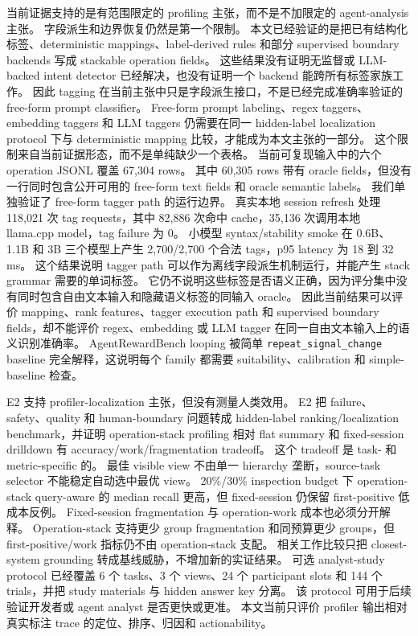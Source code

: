 \documentclass[10pt,twocolumn]{ctexart}
\begin{document}
当前证据支持的是有范围限定的 profiling 主张，而不是不加限定的 agent-analysis 主张。
字段派生和边界恢复仍然是第一个限制。
本文已经验证的是把已有结构化标签、deterministic mappings、label-derived rules 和部分 supervised boundary backends 写成 stackable operation fields。
这些结果没有证明无监督或 LLM-backed intent detector 已经解决，也没有证明一个 backend 能跨所有标签家族工作。
因此 tagging 在当前主张中只是字段派生接口，不是已经完成准确率验证的 free-form prompt classifier。
Free-form prompt labeling、regex taggers、embedding taggers 和 LLM taggers 仍需要在同一 hidden-label localization protocol 下与 deterministic mapping 比较，才能成为本文主张的一部分。
这个限制来自当前证据形态，而不是单纯缺少一个表格。
当前可复现输入中的六个 operation JSONL 覆盖 67,304 rows。
其中 60,305 rows 带有 oracle fields，但没有一行同时包含公开可用的 free-form text fields 和 oracle semantic labels。
我们单独验证了 free-form tagger path 的运行边界。
真实本地 session refresh 处理 118,021 次 tag requests，其中 82,886 次命中 cache，35,136 次调用本地 llama.cpp model，tag failure 为 0。
小模型 syntax/stability smoke 在 0.6B、1.1B 和 3B 三个模型上产生 2,700/2,700 个合法 tags，p95 latency 为 18 到 32 ms。
这个结果说明 tagger path 可以作为离线字段派生机制运行，并能产生 stack grammar 需要的单词标签。
它仍不说明这些标签是否语义正确，因为评分集中没有同时包含自由文本输入和隐藏语义标签的同输入 oracle。
因此当前结果可以评价 mapping、rank features、tagger execution path 和 supervised boundary fields，却不能评价 regex、embedding 或 LLM tagger 在同一自由文本输入上的语义识别准确率。
AgentRewardBench looping 被简单 \texttt{repeat\_signal\_change} baseline 完全解释，这说明每个 family 都需要 suitability、calibration 和 simple-baseline 检查。

E2 支持 profiler-localization 主张，但没有测量人类效用。
E2 把 failure、safety、quality 和 human-boundary 问题转成 hidden-label ranking/localization benchmark，并证明 operation-stack profiling 相对 flat summary 和 fixed-session drilldown 有 accuracy/work/fragmentation tradeoff。
这个 tradeoff 是 task- 和 metric-specific 的。
最佳 visible view 不由单一 hierarchy 垄断，source-task selector 不能稳定自动选中最优 view。
20\%/30\% inspection budget 下 operation-stack query-aware 的 median recall 更高，但 fixed-session 仍保留 first-positive 低成本反例。
Fixed-session fragmentation 与 operation-work 成本也必须分开解释。
Operation-stack 支持更少 group fragmentation 和同预算更少 groups，但 first-positive/work 指标仍不由 operation-stack 支配。
相关工作比较只把 closest-system grounding 转成基线威胁，不增加新的实证结果。
可选 analyst-study protocol 已经覆盖 6 个 tasks、3 个 views、24 个 participant slots 和 144 个 trials，并把 study materials 与 hidden answer key 分离。
该 protocol 可用于后续验证开发者或 agent analyst 是否更快或更准。
本文当前只评价 profiler 输出相对真实标注 trace 的定位、排序、归因和 actionability。
\end{document}
